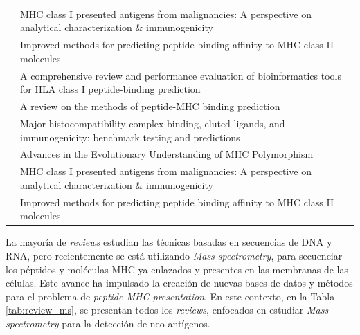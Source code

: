 \begin{table}[H]
\begin{tabular}{p{3cm}p{10cm}}
		                                                      \\
		
		\cite{schmidt2019mhc}               & MHC class I presented antigens from malignancies: A perspective on analytical characterization \& immunogenicity     \\
	
		\cite{jensen2018improved}           & Improved methods for predicting peptide binding affinity to MHC class II molecules                                   \\
		
		\cite{mei2020comprehensive}         & A comprehensive review and performance evaluation of bioinformatics tools for HLA class I peptide-binding prediction \\
		\cite{liu2020review}                & A review on the methods of peptide-MHC binding prediction                                                            \\
		\cite{paul2020major}                & Major histocompatibility complex binding, eluted ligands, and immunogenicity: benchmark testing and predictions      \\
		\cite{radwan2020advances}           & Advances in the Evolutionary Understanding of MHC Polymorphism                                                       \\
		\cite{schmidt2019mhc}               & MHC class I presented antigens from malignancies: A perspective on analytical characterization \& immunogenicity     \\
		\cite{jensen2018improved}           & Improved methods for predicting peptide binding affinity to MHC class II molecules                                  
	\end{tabular}
\end{table}

La mayoría de \textit{reviews} estudian las técnicas basadas en secuencias de DNA y RNA, pero recientemente se está utilizando \textit{Mass spectrometry}, para secuenciar los péptidos y moléculas MHC ya enlazados y presentes en las membranas de las células. Este avance ha impulsado la creación de nuevas bases de datos y métodos para el problema de \textit{peptide-MHC presentation}. En este contexto, en la Tabla \ref{tab:review_ms}, se presentan todos los \textit{reviews}, enfocados en estudiar \textit{Mass spectrometry} para la detección de neo antígenos.



